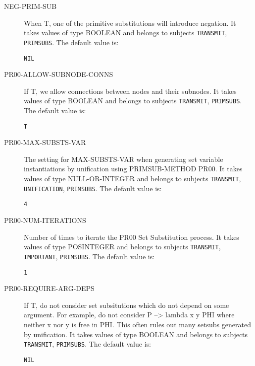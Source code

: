 \begin{description}
\item[NEG-PRIM-SUB]  
When T, one of the primitive substitutions will introduce negation.
It takes values of type BOOLEAN and belongs to subjects \texttt{TRANSMIT}, \texttt{PRIMSUBS}.  The default value is: \begin{lstlisting}
NIL
\end{lstlisting}

\item[PR00-ALLOW-SUBNODE-CONNS]  
If T, we allow connections between nodes and their subnodes.
It takes values of type BOOLEAN and belongs to subjects \texttt{TRANSMIT}, \texttt{PRIMSUBS}.  The default value is: \begin{lstlisting}
T
\end{lstlisting}

\item[PR00-MAX-SUBSTS-VAR]  
The setting for MAX-SUBSTS-VAR when generating
set variable instantiations by unification
using PRIMSUB-METHOD PR00.
It takes values of type NULL-OR-INTEGER and belongs to subjects \texttt{TRANSMIT}, \texttt{UNIFICATION}, \texttt{PRIMSUBS}.  The default value is: \begin{lstlisting}
4
\end{lstlisting}

\item[PR00-NUM-ITERATIONS]  
Number of times to iterate the PR00 Set Substitution process.
It takes values of type POSINTEGER and belongs to subjects \texttt{TRANSMIT}, \texttt{IMPORTANT}, \texttt{PRIMSUBS}.  The default value is: \begin{lstlisting}
1
\end{lstlisting}

\item[PR00-REQUIRE-ARG-DEPS]  
If T, do not consider set subsitutions which do not
depend on some argument.  For example, do not consider
    P --> lambda x y PHI
where neither x nor y is free in PHI.  This often rules out many
setsubs generated by unification.
It takes values of type BOOLEAN and belongs to subjects \texttt{TRANSMIT}, \texttt{PRIMSUBS}.  The default value is: \begin{lstlisting}
NIL
\end{lstlisting}


\end{description}
